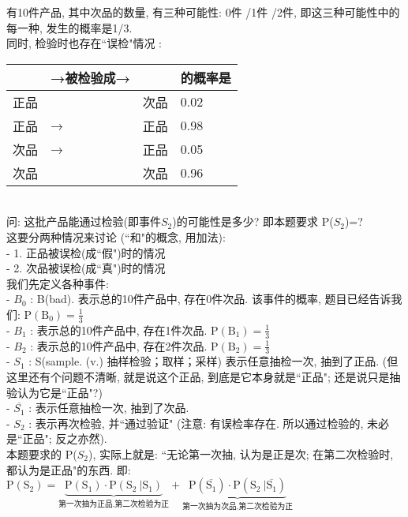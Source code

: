\documentclass[UTF8]{ctexart}
\begin{document}
\begin{myEnvSample}
	有10件产品, 其中次品的数量, 有三种可能性: 0件 /1件 /2件, 即这三种可能性中的每一种, 发生的概率是1/3.  \\
	同时, 检验时也存在``误检"情况 : \\
\begin{tabular}{|l|l|l|l|}
	\hline
	& →被检验成→ &    & 的概率是   \\
	\hline
	正品 &        & 次品 & 0.02    \\
	\hline
	正品 &    →    & 正品 & 0.98    \\
	\hline
	次品 &   →     & 正品 & 0.05    \\
	\hline
	次品 &        & 次品 & 0.96  \\
	\hline
\end{tabular}\\

	问: 这批产品能通过检验(即事件$S_2$)的可能性是多少? 即本题要求 P($S_2$)=? \\
	这要分两种情况来讨论 (``和"的概念, 用加法): \\
	- 1. 正品被误检(成``假")时的情况 \\
	- 2. 次品被误检(成``真")时的情况 \\
	
	我们先定义各种事件: \\
	- $B_0$ : B(bad). 表示总的10件产品中, 存在0件次品. 该事件的概率, 题目已经告诉我们: $\text{P}\left( \text{B}_0 \right) =\frac{1}{3}$
	\\
	- $B_1$ : 表示总的10件产品中, 存在1件次品. $\text{P}\left( \text{B}_1 \right) =\frac{1}{3}$
	\\
	- $B_2$ : 表示总的10件产品中, 存在2件次品. $\text{P}\left( \text{B}_2 \right) =\frac{1}{3}$
	\\
	- $S_1$ : S(sample. (v.) 抽样检验；取样；采样) 表示任意抽检一次, 抽到了正品. (但这里还有个问题不清晰, 就是说这个正品, 到底是它本身就是``正品"; 还是说只是抽验认为它是``正品"?) \\
	- $\overline{S_1}$ : 表示任意抽检一次, 抽到了次品. \\
	- $S_2$ : 表示再次检验, 并``通过验证" (注意: 有误检率存在. 所以通过检验的, 未必是``正品"; 反之亦然). \\
	
	
	本题要求的 P($S_2$), 实际上就是: ``无论第一次抽, 认为是正是次; 在第二次检验时, 都认为是正品"的东西. 即: $
	\text{P}\left( \text{S}_2 \right) =\underset{\text{第一次抽为正品,第二次检验为正}}{\underbrace{\text{P}\left( \text{S}_1 \right) \cdot \text{P}\left( \text{S}_2\ |\text{S}_1 \right) }}+\underset{\text{第一次抽为次品,第二次检验为正}}{\underbrace{\text{P}\left( \overline{\text{S}_1} \right) \cdot \text{P}\left( \text{S}_2\ |\overline{\text{S}_1} \right) }}
	$ \\
	

\end{myEnvSample}
\end{document}
